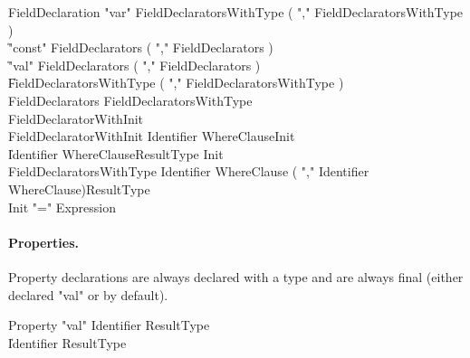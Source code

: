\begin{grammar}
FieldDeclaration
        \: \xcd"var" FieldDeclaratorsWithType ( \xcd"," FieldDeclaratorsWithType )\star \\
        \| \xcd"const" FieldDeclarators ( \xcd"," FieldDeclarators )\star \\
        \| \xcd"val" FieldDeclarators ( \xcd"," FieldDeclarators )\star \\
        \| FieldDeclaratorsWithType ( \xcd"," FieldDeclaratorsWithType )\star \\
FieldDeclarators
        \: FieldDeclaratorsWithType \\
        \: FieldDeclaratorWithInit \\
FieldDeclaratorWithInit
        \: Identifier WhereClause\opt Init \\
        \| Identifier WhereClause\opt ResultType Init \\
FieldDeclaratorsWithType
        \: Identifier WhereClause\opt
                ( \xcd"," Identifier WhereClause\opt )\star ResultType \\
Init \: \xcd"=" Expression \\
\end{grammar}

\paragraph{Properties.}
Property declarations are always declared with a type and are
always final (either declared \xcd"val" or by default).

\begin{grammar}
Property
        \: \xcd"val" Identifier ResultType \\
        \| Identifier ResultType \\
\end{grammar}
